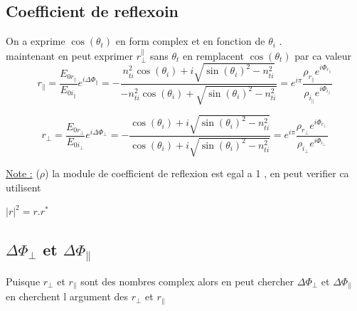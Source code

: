 \documentclass[12pt]{book}
\begin{document}
            \subsection{Coefficient de reflexoin}
                On a exprime $\cos(\theta_t)$ en form complex et en fonction de $\theta_i$ . \\
                maintenant en peut exprimer $r_\perp^\parallel$ sans $\theta_t$ en remplacent $\cos(\theta_t)$ par ca valeur \\
                \[ r_\parallel = \frac{E_{0r_\parallel}}{E_{0i_\parallel}} e^{i\Delta\Phi_\parallel} = - \frac{ n_{ti}^2\cos(\theta_i)+i\sqrt{\sin(\theta_i)^2 - n_{ti}^2 }}{-n_{ti}^2\cos(\theta_i)+\sqrt{\sin(\theta_i)^2 - n_{ti}^2 }} = e^{i\pi}\frac{\rho_{r_\parallel} e^{i\Phi_{r_\parallel}} }{\rho_{i_\parallel} e^{i\Phi_{i_\parallel}}}  \]
                \begin{center}
                \end{center}
                \[ r_\perp = \frac{E_{0r_\perp}}{E_{0i_\perp}} e^{i\Delta\Phi_\perp} = - \frac{ \cos(\theta_i)+i\sqrt{\sin(\theta_i)^2 - n_{ti}^2 }}{\cos(\theta_i)+i\sqrt{\sin(\theta_i)^2 - n_{ti}^2 }} = e^{i\pi}\frac{\rho_{r_\perp} e^{i\Phi_{r_\perp}} }{\rho_{i_\perp} e^{i\Phi_{i_\perp}}}  \]
                \begin{center}
                \end{center}
                \underline{Note :} ($\rho$) la module de coefficient de reflexion est egal a 1 , en peut verifier ca utilisent
                    \begin{center}
                        $| r |^2 = r.r^*$
                    \end{center}
            \subsection{$\Delta\Phi_\perp$ et $\Delta\Phi_\parallel$}
                    Puisque $r_\perp$ et $r_\parallel$ sont des nombres complex alors en peut chercher $\Delta\Phi_\perp$ et $\Delta\Phi_\parallel$ en cherchent l argument des $r_\perp$ et $r_\parallel$ 
                    \begin{center}
                    \end{center}
\end{document}
